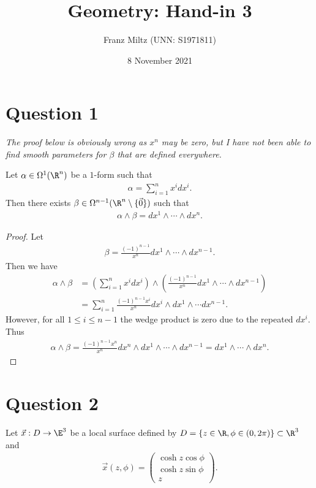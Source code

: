 \documentclass{article}
\begin{document}
\title{Geometry: Hand-in 3}
\author{Franz Miltz (UNN: S1971811)}
\date{8 November 2021}
\maketitle

\section*{Question 1}

\emph{The proof below is obviously wrong as $x^n$ may be zero,
   but I have not been able to find smooth parameters for $\beta$ that are defined everywhere.}

\begin{claim*}
   Let $\alpha\in\Omega^1(\R^n)$ be a $1$-form such that
   \begin{align*}
      \alpha=\sum_{i=1}^n x^idx^i.
   \end{align*}
   Then there exists $\beta\in\Omega^{n-1}(\R^n\setminus\{\vec 0\})$ such that
   \begin{align*}
      \alpha\wedge\beta = dx^1\wedge\cdots\wedge dx^n.
   \end{align*}
\end{claim*}
\begin{proof}
   Let
   \begin{align*}
      \beta = \frac{(-1)^{n-1}}{x^n}dx^1\wedge\cdots\wedge dx^{n-1}.
   \end{align*}
   Then we have
   \begin{align*}
      \alpha\wedge\beta & = \left(\sum_{i=1}^n x^idx^i\right) \wedge \left(\frac{(-1)^{n-1}}{x^n}dx^1\wedge\cdots\wedge dx^{n-1}\right) \\
                        & = \sum_{i=1}^n \frac{(-1)^{n-1}x^i}{x^n}dx^i\wedge dx^1 \wedge \cdots dx^{n-1}.
   \end{align*}
   However, for all $1\leq i\leq n-1$ the wedge product is zero due to the repeated $dx^i$. Thus
   \begin{align*}
      \alpha\wedge\beta = \frac{(-1)^{n-1}x^n}{x^n}dx^n\wedge dx^1\wedge\cdots\wedge dx^{n-1}=dx^1\wedge\cdots\wedge dx^n.
   \end{align*}
\end{proof}

\section*{Question 2}

Let $\vec x: D\to\E^3$ be a local surface defined by $D=\{z\in\R,\phi\in(0,2\pi)\}\subset\R^3$ and
\begin{align*}
   \vec x(z,\phi)=\begin{pmatrix}
      \cosh z \cos\phi \\ \cosh z \sin\phi \\ z
   \end{pmatrix}.
\end{align*}
\end{document}
